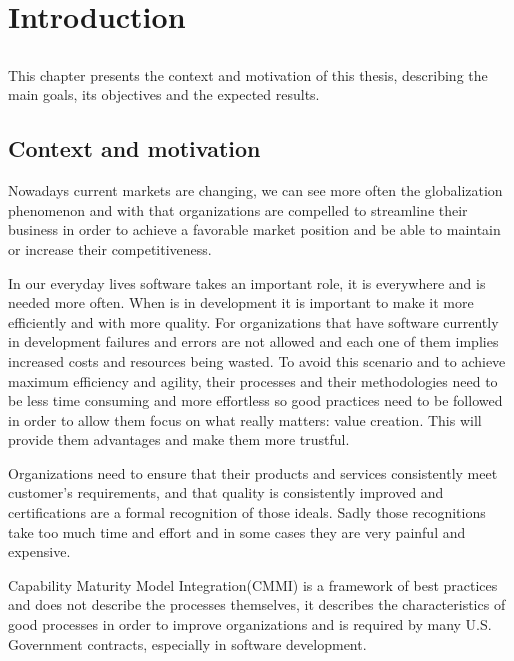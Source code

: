 \chapter{Introduction} \label{chap:intro}

\section*{}

This chapter presents the context and motivation of this thesis, describing the main goals, its objectives and the expected results.

\section{Context and motivation} \label{sec:context}

Nowadays current markets are changing, we can see more often the globalization phenomenon and with that organizations are compelled to streamline their business in order to achieve a favorable market position and be able to maintain or increase their competitiveness.

In our everyday lives software takes an important role, it is everywhere and is needed more often. When is in development it is important to make it more efficiently and with more quality. For organizations that have software currently in development failures and errors are not allowed and each one of them implies increased costs and resources being wasted. To avoid this scenario and to achieve maximum efficiency and agility, their processes and their methodologies need to be less time consuming and more effortless so good practices need to be followed in order to allow them focus on what really matters: value creation. This will provide them advantages and make them more trustful.

Organizations need to ensure that their products and services consistently meet customer’s requirements, and that quality is consistently improved and certifications are a formal recognition of those ideals. Sadly those recognitions take too much time and effort and in some cases they are very painful and expensive.

Capability Maturity Model Integration(CMMI) is a framework of best practices and does not describe the processes themselves, it describes the characteristics of good processes in order to improve organizations and is required by many U.S. Government contracts, especially in software development.

